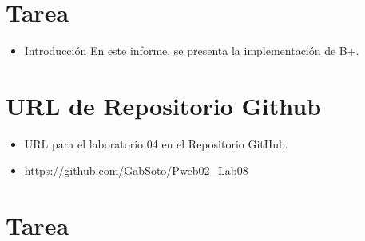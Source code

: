\documentclass{article}
\begin{document}
	\section{Tarea}
	\begin{itemize}
		\item Introducción
En este informe, se presenta la implementación de B+.

	\end{itemize}	
		

	\section{URL de Repositorio Github}
	\begin{itemize}
		\item URL para el laboratorio 04 en el Repositorio GitHub.
		\item \url{ https://github.com/GabSoto/Pweb02_Lab08}
	\end{itemize}
	
	\section{Tarea}
\end{document}
